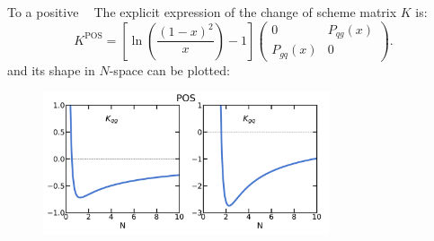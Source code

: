 \documentclass[9pt]{beamer}
\DeclareMathOperator{\msbar}{\overline{MS}}
\DeclareMathOperator{\pos}{POS}
\begin{document}
\begin{frame}{To a positive $\msbar$}
    The explicit expression of the change of scheme matrix $K$ is:
    \begin{equation*}
        K^{\pos}=\left[\ln\left(\frac{(1-x)^2}{x}\right) - 1\right]
        \left(\begin{array}{cc} 0 & P_{qg}(x) \\
        P_{gq}(x) & 0\end{array}\right).
    \end{equation*}
    and its shape in $N$-space can be plotted:
    \begin{figure}
      \includegraphics[width=0.75\textwidth]{pictures/kmatrix-offdiagonal-9}
    \end{figure}
\end{frame}
\end{document}
